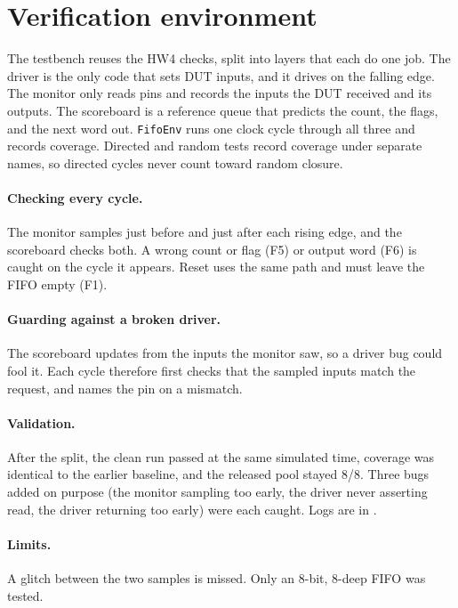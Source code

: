 \section{Verification environment}
\label{sec:env}

The testbench reuses the HW4 checks, split into layers that each do one job.
The driver is the only code that sets DUT inputs, and it drives on the falling
edge. The monitor only reads pins and records the inputs the DUT received and
its outputs. The scoreboard is a reference queue that predicts the count, the
flags, and the next word out. \texttt{FifoEnv} runs one clock cycle through
all three and records coverage. Directed and random tests record coverage
under separate names, so directed cycles never count toward random closure.

\paragraph{Checking every cycle.} The monitor samples just before and just
after each rising edge, and the scoreboard checks both. A wrong count or flag
(F5) or output word (F6) is caught on the cycle it appears. Reset uses the
same path and must leave the FIFO empty (F1).

\paragraph{Guarding against a broken driver.} The scoreboard updates from the
inputs the monitor saw, so a driver bug could fool it. Each cycle therefore
first checks that the sampled inputs match the request, and names the pin on
a mismatch.

\paragraph{Validation.} After the split, the clean run passed at the same
simulated time, coverage was identical to the earlier baseline, and the
released pool stayed 8/8. Three bugs added on purpose (the monitor sampling
too early, the driver never asserting read, the driver returning too early)
were each caught. Logs are in .

\paragraph{Limits.} A glitch between the two samples is missed. Only an
8-bit, 8-deep FIFO was tested.
